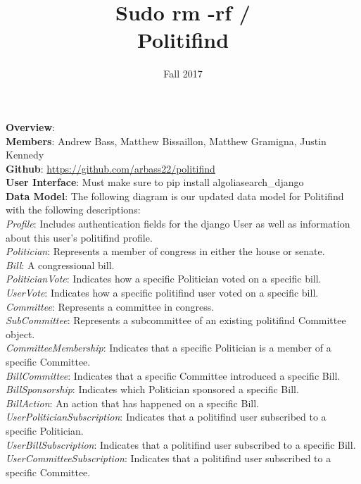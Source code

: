 \documentclass{article}
\newcommand{\n}{\noindent}
\begin{document}
\title{Sudo rm -rf / \\ \large{Politifind}}
\author{Fall 2017}
\date{}
\maketitle

\n\textbf{Overview}:\\

\n\textbf{Members}: Andrew Bass, Matthew Bissaillon, Matthew Gramigna, Justin Kennedy \\

\n\textbf{Github}: \url{https://github.com/arbass22/politifind} \\

\n\textbf{User Interface}: Must make sure to pip install algoliasearch\_django\\

\n\textbf{Data Model}: The following diagram is our updated data model for Politifind with the following descriptions: \\ 

\n\textit{Profile}: Includes authentication fields for the django User as well as information about this user's politifind profile. \\
\n\textit{Politician}: Represents a member of congress in either the house or senate. \\
\n\textit{Bill}: A congressional bill.\\
\n\textit{PoliticianVote}: Indicates how a specific Politician voted on a specific bill. \\
\n\textit{UserVote}: Indicates how a specific politifind user voted on a specific bill.\\
\n\textit{Committee}: Represents a committee in congress. \\
\n\textit{SubCommittee}: Represents a subcommittee of an existing politifind Committee object. \\
\n\textit{CommitteeMembership}: Indicates that a specific Politician is a member of a specific Committee. \\
\n\textit{BillCommittee}: Indicates that a specific Committee introduced a specific Bill. \\
\n\textit{BillSponsorship}: Indicates which Politician sponsored a specific Bill. \\
\n\textit{BillAction}: An action that has happened on a specific Bill. \\
\n\textit{UserPoliticianSubscription}: Indicates that a politifind user subscribed to a specific Politician. \\
\n\textit{UserBillSubscription}: Indicates that a politifind user subscribed to a specific Bill.\\
\n\textit{UserCommitteeSubscription}: Indicates that a politifind user subscribed to a specific Committee.\\
\end{document}
